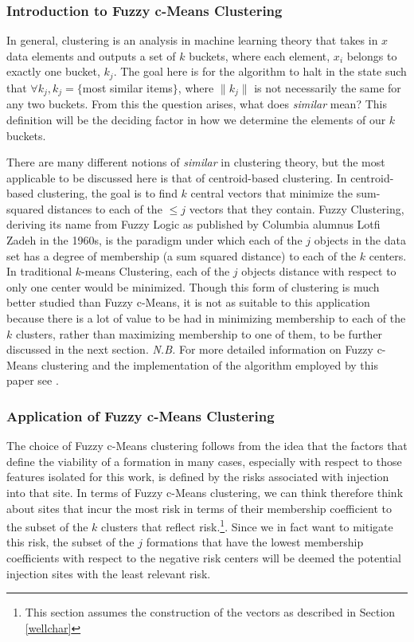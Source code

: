 \documentclass[letterpaper, 12pt]{article}
\begin{document}
\subsubsection{Introduction to Fuzzy c-Means Clustering}
\par In general, clustering is an analysis in machine learning theory that takes in $x$ data elements and outputs a set of $k$ buckets, where each element, $x_i$ belongs to exactly one bucket, $k_j$. The goal here is for the algorithm to halt in the state such that $\forall k_j, k_j = \{$most similar items$\}$, where $\|k_j\|$ is not necessarily the same for any two buckets. From this the question arises, what does \emph{similar} mean? This definition will be the deciding factor in how we determine the elements of our $k$ buckets.   

\par There are many different notions of \emph{similar} in clustering theory, but the most applicable to be discussed here is that of centroid-based clustering. In centroid-based clustering, the goal is to find $k$ central vectors that minimize the sum-squared distances to each of the $\leq j$ vectors that they contain. Fuzzy Clustering, deriving its name from Fuzzy Logic as published by Columbia alumnus Lotfi Zadeh in the 1960s, is the paradigm under which each of the $j$ objects in the data set has a degree of membership (a sum squared distance) to each of the $k$ centers. In traditional $k$-means Clustering, each of the $j$ objects distance with respect to only one center would be minimized. Though this form of clustering is much better studied than Fuzzy c-Means, it is not as suitable to this application because there is a lot of value to be had in minimizing membership to each of the $k$ clusters, rather than maximizing membership to one of them, to be further discussed in the next section.  
\emph{N.B.} For more detailed information on Fuzzy c-Means clustering and the implementation of the algorithm employed by this paper see \cite{cmeanspaper}. 

\subsubsection{Application of Fuzzy c-Means Clustering} 
\par The choice of Fuzzy c-Means clustering follows from the idea that the factors that define the viability of a formation in many cases, especially with respect to those features isolated for this work, is defined by the risks associated with injection into that site. In terms of Fuzzy c-Means clustering, we can think therefore think about sites that incur the most risk in terms of their membership coefficient to the subset of the $k$ clusters that reflect risk.\footnote{This section assumes the construction of the vectors as described in Section \ref{wellchar}}. Since we in fact want to mitigate this risk, the subset of the $j$ formations that have the lowest membership coefficients with respect to the negative risk centers will be deemed the potential injection sites with the least relevant risk.
\end{document}

